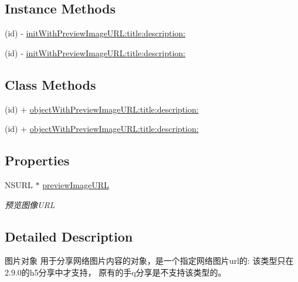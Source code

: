 \subsection*{Instance Methods}
\begin{DoxyCompactItemize}
\item 
(id) -\/ \mbox{\hyperlink{interface_q_q_api_web_image_object_a450e92eb143928d54e75c7e3111dffcb}{init\+With\+Preview\+Image\+U\+R\+L\+:title\+:description\+:}}
\item 
(id) -\/ \mbox{\hyperlink{interface_q_q_api_web_image_object_a450e92eb143928d54e75c7e3111dffcb}{init\+With\+Preview\+Image\+U\+R\+L\+:title\+:description\+:}}
\end{DoxyCompactItemize}
\subsection*{Class Methods}
\begin{DoxyCompactItemize}
\item 
(id) + \mbox{\hyperlink{interface_q_q_api_web_image_object_a31a0bbcb1cbb2b76d8e8bc2ea8f1549a}{object\+With\+Preview\+Image\+U\+R\+L\+:title\+:description\+:}}
\item 
(id) + \mbox{\hyperlink{interface_q_q_api_web_image_object_a31a0bbcb1cbb2b76d8e8bc2ea8f1549a}{object\+With\+Preview\+Image\+U\+R\+L\+:title\+:description\+:}}
\end{DoxyCompactItemize}
\subsection*{Properties}
\begin{DoxyCompactItemize}
\item 
\mbox{\label{interface_q_q_api_web_image_object_a59a8d2a707a13490e24985c53855a513}} 
N\+S\+U\+RL $\ast$ \mbox{\hyperlink{interface_q_q_api_web_image_object_a59a8d2a707a13490e24985c53855a513}{preview\+Image\+U\+RL}}
\begin{DoxyCompactList}\small\item\em 预览图像\+U\+RL \end{DoxyCompactList}\end{DoxyCompactItemize}


\subsection{Detailed Description}
图片对象 用于分享网络图片内容的对象，是一个指定网络图片url的\+: 该类型只在2.9.\+0的h5分享中才支持， 原有的手q分享是不支持该类型的。 

